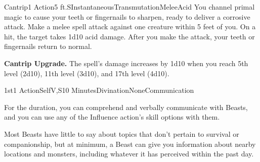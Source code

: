 \begin{Spell}{Cantrip}{1 Action}{5 ft.}{S}{Instantaneous}{Transmutation}{Melee}{Acid}
You channel primal magic to cause your teeth or fingernails to sharpen, ready to deliver a corrosive attack. Make a melee spell attack against one creature within 5 feet of you. On a hit, the target takes 1d10 acid damage. After you make the attack, your teeth or fingernails return to normal.

\textbf{Cantrip Upgrade.} The spell's damage increases by 1d10 when you reach 5th level (2d10), 11th level (3d10), and 17th level (4d10).
\end{Spell}


\begin{Spell}{1st}{1 Action}{Self}{V,S}{10 Minutes}{Divination}{None}{Communication}

For the duration, you can comprehend and verbally communicate with Beasts, and you can use any of the Influence action's skill options with them.

Most Beasts have little to say about topics that don't pertain to survival or companionship, but at minimum, a Beast can give you information about nearby locations and monsters, including whatever it has perceived within the past day.

\end{Spell}

